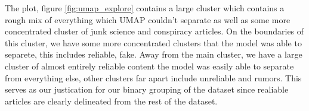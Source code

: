 The plot, figure \ref{fig:umap_explore} contains a large cluster which contains a rough mix of everything which UMAP
couldn't separate as well as some more concentrated cluster of junk science and conspiracy articles. On the boundaries
of this cluster, we have some more concentrated clusters that the model was able to separete, this includes reliable,
fake. Away from the main cluster, we have a large cluster of almost entirely reliable content the model was easily able
to separate from everything else, other clusters far apart include unreliable and rumors. This serves as our justication for our binary grouping of the dataset since realiable articles are clearly delineated from the rest of the dataset. 



